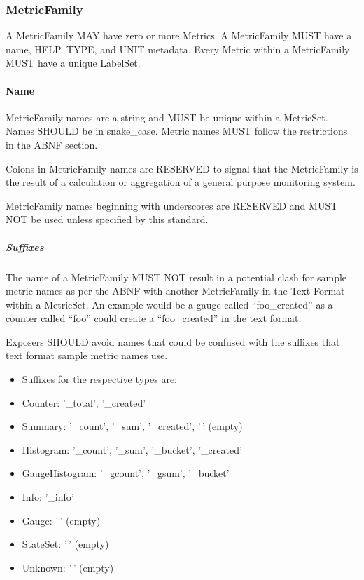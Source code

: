 \documentclass[a4paper,12pt,notitlepage,twoside,openright]{article}
\begin{document}
\hypertarget{metricfamily}{%
\subsubsection{MetricFamily}\label{metricfamily}}

A MetricFamily MAY have zero or more Metrics. A MetricFamily MUST have a
name, HELP, TYPE, and UNIT metadata. Every Metric within a MetricFamily
MUST have a unique LabelSet.

\hypertarget{name}{%
\paragraph{Name}\label{name}}

MetricFamily names are a string and MUST be unique within a MetricSet.
Names SHOULD be in snake\_case. Metric names MUST follow the
restrictions in the ABNF section.

Colons in MetricFamily names are RESERVED to signal that the
MetricFamily is the result of a calculation or aggregation of a general
purpose monitoring system.

MetricFamily names beginning with underscores are RESERVED and MUST NOT
be used unless specified by this standard.

\hypertarget{suffixes}{%
\subparagraph{Suffixes}\label{suffixes}}

The name of a MetricFamily MUST NOT result in a potential clash for
sample metric names as per the ABNF with another MetricFamily in the
Text Format within a MetricSet. An example would be a gauge called
``foo\_created'' as a counter called ``foo'' could create a
``foo\_created'' in the text format.

Exposers SHOULD avoid names that could be confused with the suffixes
that text format sample metric names use.

\begin{itemize}
\item
  Suffixes for the respective types are:
\item
  Counter: '\_total', '\_created'
\item
  Summary: '\_count', '\_sum', '\_created', '\,' (empty)
\item
  Histogram: '\_count', '\_sum', '\_bucket', '\_created'
\item
  GaugeHistogram: '\_gcount', '\_gsum', '\_bucket'
\item
  Info: '\_info'
\item
  Gauge: '\,' (empty)
\item
  StateSet: '\,' (empty)
\item
  Unknown: '\,' (empty)
\end{itemize}
\end{document}
